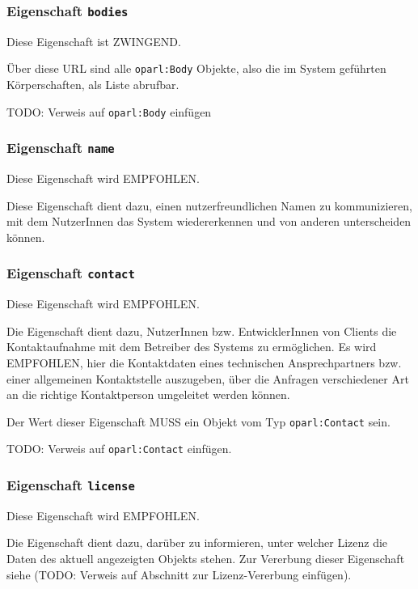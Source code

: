 \documentclass[,a4paper]{article}
\begin{document}
\subsubsection{Eigenschaft \texttt{bodies}}

Diese Eigenschaft ist ZWINGEND.

Über diese URL sind alle \texttt{oparl:Body} Objekte, also die im System
geführten Körperschaften, als Liste abrufbar.

TODO: Verweis auf \texttt{oparl:Body} einfügen

\subsubsection{Eigenschaft \texttt{name}}

Diese Eigenschaft wird EMPFOHLEN.

Diese Eigenschaft dient dazu, einen nutzerfreundlichen Namen zu
kommunizieren, mit dem NutzerInnen das System wiedererkennen und von
anderen unterscheiden können.

\subsubsection{Eigenschaft \texttt{contact}}

Diese Eigenschaft wird EMPFOHLEN.

Die Eigenschaft dient dazu, NutzerInnen bzw. EntwicklerInnen von Clients
die Kontaktaufnahme mit dem Betreiber des Systems zu ermöglichen. Es
wird EMPFOHLEN, hier die Kontaktdaten eines technischen Ansprechpartners
bzw. einer allgemeinen Kontaktstelle auszugeben, über die Anfragen
verschiedener Art an die richtige Kontaktperson umgeleitet werden
können.

Der Wert dieser Eigenschaft MUSS ein Objekt vom Typ
\texttt{oparl:Contact} sein.

TODO: Verweis auf \texttt{oparl:Contact} einfügen.

\subsubsection{Eigenschaft \texttt{license}}

Diese Eigenschaft wird EMPFOHLEN.

Die Eigenschaft dient dazu, darüber zu informieren, unter welcher Lizenz
die Daten des aktuell angezeigten Objekts stehen. Zur Vererbung dieser
Eigenschaft siehe (TODO: Verweis auf Abschnitt zur Lizenz-Vererbung
einfügen).
\end{document}

